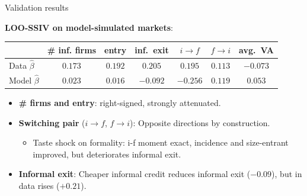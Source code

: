 \documentclass[11pt,aspectratio=169]{beamer}
\providecommand{\infml}{i}
\providecommand{\fml}{f}
\begin{document}

\begin{frame}{Validation results}

\textbf{LOO-SSIV on model-simulated markets}:

\begin{center}
    \renewcommand{\arraystretch}{1.2}
    \begin{tabular}{lcccccc}
        \toprule
         & \# inf. firms & entry & inf.\ exit & $\infml{\to}\fml$ &
         $\fml{\to}\infml$ & avg.\ VA \\
        \midrule
        Data $\hat\beta$ & $0.173$ & $0.192$ & $0.205$ & $0.195$ &
         $0.113$ & $-0.073$ \\
        Model $\hat\beta$ & $0.023$ & $0.016$ & $-0.092$ & $-0.256$ & $0.119$ &
         $0.053$ \\
        \bottomrule
    \end{tabular}
\end{center}

\medskip
\begin{itemize}
  \item \textbf{\# firms and entry}: right-signed, strongly attenuated.
  \item \textbf{Switching pair} ($\infml{\to}\fml$, $\fml{\to}\infml$): Opposite directions by construction. 
  \begin{itemize}
      \item Taste shock on formality: i-f moment exact, incidence and size-entrant improved, but deteriorates informal exit. 
  \end{itemize}
  \item \textbf{Informal exit}: Cheaper informal credit reduces informal exit ($-0.09$), but in data rises ($+0.21$).
\end{itemize}

\end{frame}
 
\end{document}
